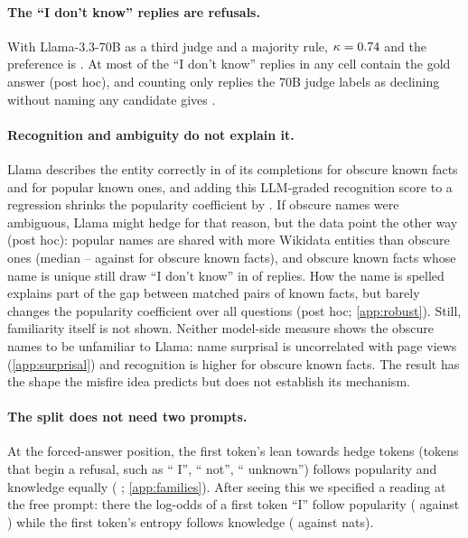 \documentclass{article}
\newcommand{\idk}{``I don't know''}
\begin{document}
\paragraph{The \idk{} replies are refusals.} With Llama-3.3-70B as a third judge and a majority rule, $\kappa=0.74$ and the preference is \tjLlamaDiff. At most \lcDKAliasMax{} of the \idk{} replies in any cell contain the gold answer (post hoc), and counting only replies the 70B judge labels as declining without naming any candidate gives \sdDiff{} \sdDiffCI.

\paragraph{Recognition and ambiguity do not explain it.} Llama describes the entity correctly in \ekObsKnown{} of its completions for obscure known facts and \ekPopKnown{} for popular known ones, and adding this LLM-graded recognition score to a regression shrinks the popularity coefficient by \ekShrink. If obscure names were ambiguous, Llama might hedge for that reason, but the data point the other way (post hoc): popular names are shared with more Wikidata entities than obscure ones (median \amPopKnownHom--\amPopUnkHom{} against \amObsKnownHom{} for obscure known facts), and obscure known facts whose name is unique still draw \idk{} in \amSingle{} of replies. How the name is spelled explains part of the gap between matched pairs of known facts, but barely changes the popularity coefficient over all questions (post hoc; \cref{app:robust}). Still, familiarity itself is not shown. Neither model-side measure shows the obscure names to be unfamiliar to Llama: name surprisal is uncorrelated with page views (\cref{app:surprisal}) and recognition is higher for obscure known facts. The result has the shape the misfire idea predicts but does not establish its mechanism.

\paragraph{The split does not need two prompts.} At the forced-answer position, the first token's lean towards hedge tokens (tokens that begin a refusal, such as `` I'', `` not'', `` unknown'') follows popularity and knowledge equally (\loLlamaDiff{} \loLlamaDiffCI; \cref{app:families}). After seeing this we specified a reading at the free prompt: there the log-odds of a first token ``I'' follow popularity (\eoFreeIPop{} against \eoFreeIKnow) while the first token's entropy follows knowledge (\eoFreeEntKnow{} against \eoFreeEntPop{} nats).
\end{document}
